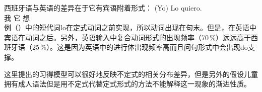 西班牙语与英语的差异在于它有宾语附着形式：
\ea
\gll (Yo) Lo quiero.\\
     我 它 想\\
\z
例（）中的短代词lo在定式动词之前实现，所以动词出现在句末。但是，在英语中宾语在动词之后。另外，英语输入中复合动词形式的出现频率（70\,\%）远远高于西班牙语（25\,\%）。这是因为英语中的进行体出现频率高而且问句形式中会出现do支撑。

这里提出的习得模型可以很好地反映不定式的相关分布差异，但是另外的假设儿童拥有成人语法但是用不定式代替定式形式的方法不能解释这一现象的渐进性质。

